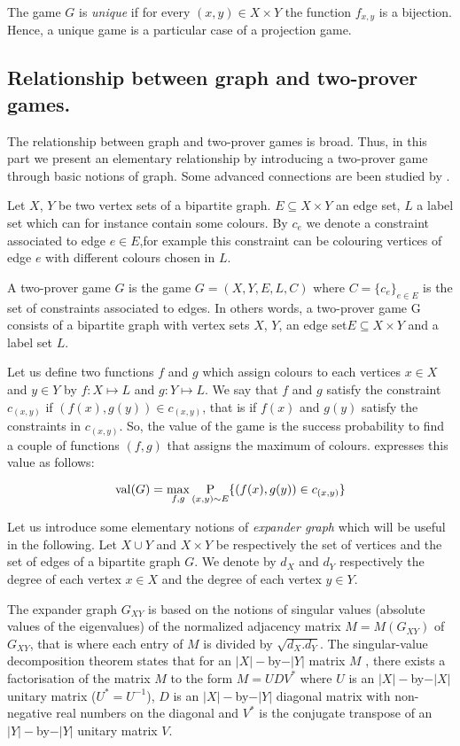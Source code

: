 The game $G$ is \textit{unique} if for every $(x,y) \in X \times Y$ the function $f_{x,y}$ is a bijection. Hence, a unique game is a particular case of a projection game. 


\subsection{Relationship between graph and two-prover games.} \label{expander}

The relationship between graph and two-prover games is broad. Thus, in this part we present an elementary  relationship by introducing a two-prover game through basic notions of graph. Some advanced connections are been studied by  \cite{laekhanukit2014parameters,tamaki2015parallel,dinur2016multiplayer}.

Let $X$, $Y$ be two vertex sets of a bipartite graph. $E\subseteq X \times Y$ an edge set, $L$ a label set which can for instance contain some colours. By $c_e$ we denote a constraint associated to edge $e \in E$,for example  this constraint can be colouring vertices of edge $e$ with different colours chosen in $L$.

A two-prover game $G$ is the game $G=(X,Y,E,L,C)$ where $C=\{c_e\}_{e\in E}$ is the set of constraints associated to edges. In others words, a two-prover game G consists of a bipartite graph with vertex
sets $X$, $Y$, an edge set$ E \subseteq X \times Y$ and a label set $L.$

 Let us define two functions $f$ and $g$ which assign colours to each vertices  $x \in X$ and $y \in Y$ by $f: X\longmapsto L$ and $g: Y\longmapsto L$. We say that $f$ and $g$ satisfy the constraint $c_{(x,y)}$ if $(f(x),g(y)) \in c_{(x,y)}$, that is if $f(x)$ and $g(y)$ satisfy the constraints in $c_{(x,y)}$. So, the value of the game is the success probability to find a couple of functions $(f,g)$ that assigns the maximum of colours.    \cite{tamaki2015parallel} expresses this value as follows:
 
 $$\mathrm{val} (G)=\max_{f,g}\underset{(x,y)\sim E}{ \mathrm{P}} \{(f(x),g(y)) \in c_{(x,y)} \}$$

Let us introduce some elementary notions of \textit{expander graph} which will be useful in the following.  Let $X \cup Y$ and $X\times Y$ be respectively the set of vertices and the set of edges of a bipartite graph $G$. We denote by $d_X$ and $d_Y$ respectively the degree of each vertex $x\in X$ and the degree of each vertex $y \in Y.$

The expander graph $G_{XY}$ is based on the notions of  singular values (absolute values of the eigenvalues) of the normalized adjacency matrix $M=M(G_{XY})$ of $G_{XY}$, that is where each entry of $M$ is divided by $\sqrt{d_X.d_Y}.$ The singular-value decomposition theorem states that for an $|X|-$by$-|Y|$  matrix $M$ , there exists a factorisation of the matrix $M$ to the form $M=UDV^*$ where $U$ is an $|X|-$by$-|X|$ unitary matrix ($U^*=U^{-1}$), $D$ is an $|X|-$by$-|Y|$ diagonal matrix with non-negative real numbers on the diagonal and $V^*$ is the conjugate transpose of an $|Y|-$by$-|Y|$ unitary matrix $V$.

